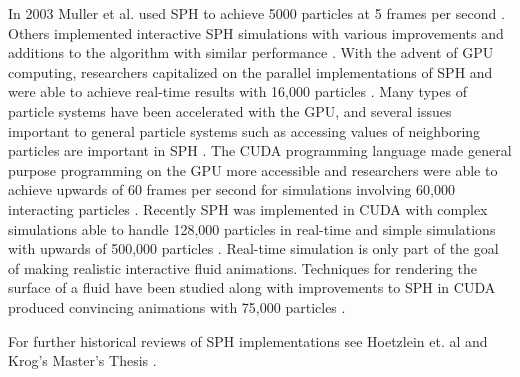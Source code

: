 In 2003 Muller et al. used SPH to achieve 5000 particles at 5 frames per
second \cite{Muller2003}.  Others implemented interactive SPH simulations with
various improvements and additions to the algorithm with similar
performance \cite{Kallin2009}\cite{Kelager2006}.
With the advent of GPU computing, researchers capitalized on the parallel
implementations of SPH and were able to achieve real-time results with 16,000 particles \cite{Harada2007a}.
Many types of particle systems have been accelerated with the GPU, and several issues
important to general particle systems such as accessing values of neighboring
particles are important in SPH \cite{Knowles2009}.
The CUDA programming language made general purpose programming on the GPU more
accessible and researchers were able to achieve upwards of 60 frames per second
for simulations involving 60,000 interacting particles \cite{Seizinger2010}.
Recently SPH was implemented in CUDA with complex simulations able to handle
128,000 particles in real-time and simple simulations with upwards of 500,000
particles \cite{Krog2010}. Real-time simulation is only part of the goal of making
realistic interactive fluid animations. Techniques for rendering the
surface of a fluid have been studied along with improvements to SPH in CUDA 
produced convincing animations with 75,000 particles \cite{Goswami2010}.


For further historical reviews of SPH implementations see Hoetzlein et.
al \cite{Hoetzlein} and Krog's Master's Thesis \cite{Krog2010}.



